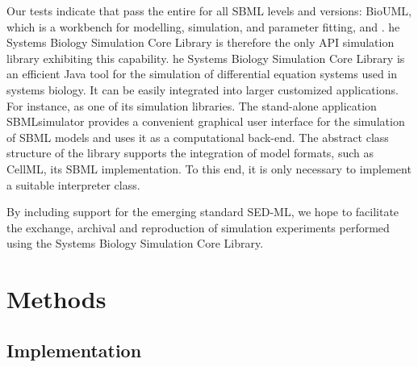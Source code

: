 \documentclass[10pt]{bmc_article}
\newenvironment{bmcformat}{\begin{raggedright}\baselineskip20pt\sloppy\setboolean{publ}{false}}{\end{raggedright}\baselineskip20pt\sloppy}
\begin{document}
\begin{bmcformat}
Our tests indicate that  pass the
entire  for all \acs{SBML} levels and versions: BioUML, which is
a workbench for modelling, simulation, and parameter fitting, and .
he
Systems Biology Simulation Core Library\COR{,} is therefore the only \acs{API}
simulation library exhibiting this capability.
%
he Systems Biology Simulation Core
Library is an efficient Java tool for the simulation of differential equation
systems used in systems biology.
It can be easily integrated into larger customized applications.
For instance,  as one of its  simulation libraries.
The stand-alone application SBMLsimulator 
provides a convenient graphical user interface for the simulation of \acs{SBML}
models and uses it as a computational back-end.
The abstract class structure of the library supports the integration of
 model formats, such as CellML,
 its \acs{SBML} implementation.
To this end, it is only necessary to implement a suitable interpreter class.



By including support for the emerging standard \acs{SED-ML}, we hope to
facilitate the exchange, archival and reproduction of simulation experiments
performed using the Systems Biology Simulation Core Library.

\section*{Methods}

\subsection*{Implementation}


\end{bmcformat}
\end{document}

